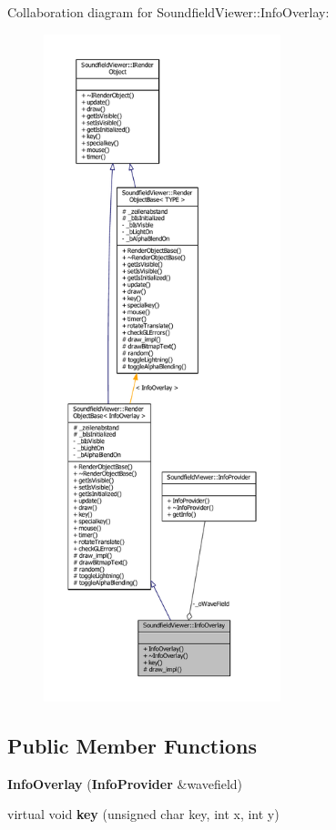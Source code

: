 Collaboration diagram for Soundfield\-Viewer\-:\-:Info\-Overlay\-:\nopagebreak
\begin{figure}[H]
\begin{center}
\leavevmode
\includegraphics[height=550pt]{da/d96/classSoundfieldViewer_1_1InfoOverlay__coll__graph}
\end{center}
\end{figure}
\subsection*{Public Member Functions}
\begin{DoxyCompactItemize}
\item 
{\bfseries Info\-Overlay} ({\bf Info\-Provider} \&wavefield)\label{classSoundfieldViewer_1_1InfoOverlay_a5a7b50a69aa2bbbae6087f693d85c032}

\item 
virtual void {\bfseries key} (unsigned char key, int x, int y)\label{classSoundfieldViewer_1_1InfoOverlay_ad04dcece97043b948ae9af471172e5c0}

\end{DoxyCompactItemize}
